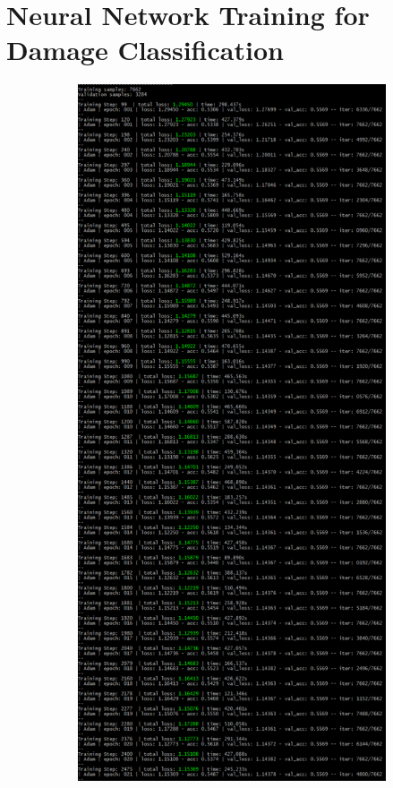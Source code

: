 \section{Neural Network Training for Damage Classification} \label{an:nnclas}

\begin{figure}[H]
	\centering
	\begin{subfigure}{.475\textwidth}
		\centering
		\includegraphics[width=.975\linewidth]{figs/TrainingClas.png}

\end{subfigure}
\end{figure}
